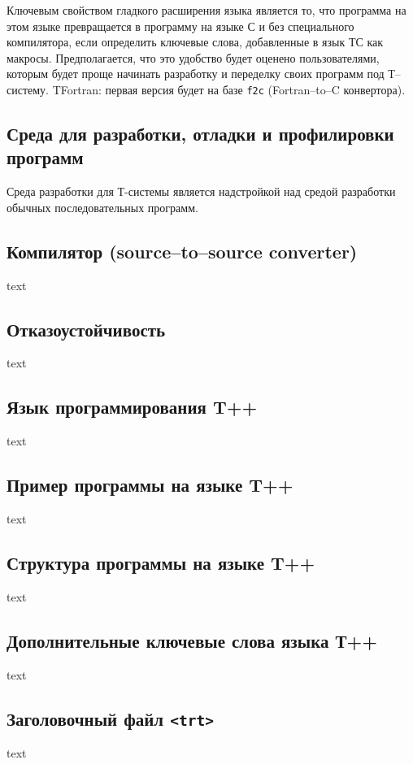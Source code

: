 Ключевым свойством гладкого расширения языка является то,
что программа на этом языке превращается в программу на
языке С и без специального компилятора, если определить
ключевые слова, добавленные в язык ТС как макросы. Предполагается,
что это удобство будет оценено пользователями, которым будет проще
начинать разработку и переделку своих программ под Т--систему.
TFortran: первая версия будет на базе {\tt f2c} (Fortran--to--C конвертора).

\subsection{Среда для разработки, отладки и профилировки программ}
Среда разработки для Т-системы является надстройкой над средой
разработки обычных последовательных программ.

\subsection{Компилятор (source--to--source converter)}
text

\subsection{Отказоустойчивость}
text

\subsection{Язык программирования T++}
text

\subsection{Пример программы на языке T++}
text

\subsection{Структура программы на языке T++}
text

\subsection{Дополнительные ключевые слова языка Т++}
text

\subsection{Заголовочный файл {\tt<trt>}}
text

